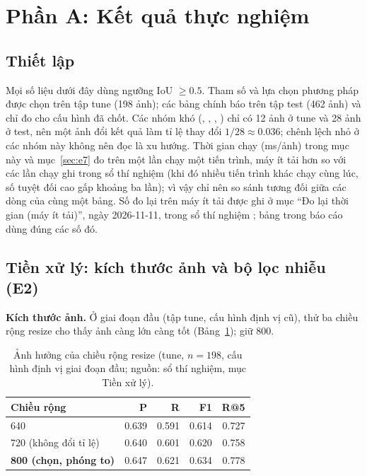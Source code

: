 \section{Phần A: Kết quả thực nghiệm}
\label{sec:a-results}

\subsection{Thiết lập}

Mọi số liệu dưới đây dùng ngưỡng IoU $\ge 0.5$. Tham số và lựa chọn phương pháp được chọn trên tập tune (198 ảnh); các bảng chính báo trên tập test (462 ảnh) và chỉ đo cho cấu hình đã chốt. Các nhóm khó (, , , ) chỉ có 12 ảnh ở tune và 28 ảnh ở test, nên một ảnh đổi kết quả làm tỉ lệ thay đổi $1/28\approx 0.036$; chênh lệch nhỏ ở các nhóm này không nên đọc là xu hướng. Thời gian chạy (ms/ảnh) trong mục này và mục~\ref{sec:e7} đo trên một lần chạy một tiến trình, máy ít tải hơn so với các lần chạy ghi trong sổ thí nghiệm (khi đó nhiều tiến trình khác chạy cùng lúc, số tuyệt đối cao gấp khoảng ba lần); vì vậy chỉ nên so sánh tương đối giữa các dòng của cùng một bảng. Số đo lại trên máy ít tải được ghi ở mục ``Đo lại thời gian (máy ít tải)'', ngày 2026-11-11, trong sổ thí nghiệm ; bảng trong báo cáo dùng đúng các số đó.

\subsection{Tiền xử lý: kích thước ảnh và bộ lọc nhiễu (E2)}
\label{sec:e2}

\textbf{Kích thước ảnh.} Ở giai đoạn đầu (tập tune, cấu hình định vị cũ), thử ba chiều rộng resize cho thấy ảnh càng lớn càng tốt (Bảng~\ref{tab:resize}); giữ 800.

\begin{table}[htbp]
\centering
\caption{Ảnh hưởng của chiều rộng resize (tune, $n=198$, cấu hình định vị giai đoạn đầu; nguồn: sổ thí nghiệm, mục Tiền xử lý).}
\label{tab:resize}
\small
\begin{tabular}{lrrrr}
\toprule
Chiều rộng & P & R & F1 & R@5 \\
\midrule
640 & 0.639 & 0.591 & 0.614 & 0.727 \\
720 (không đổi tỉ lệ) & 0.640 & 0.601 & 0.620 & 0.758 \\
\textbf{800 (chọn, phóng to)} & 0.647 & 0.621 & 0.634 & 0.778 \\
\bottomrule
\end{tabular}
\end{table}

